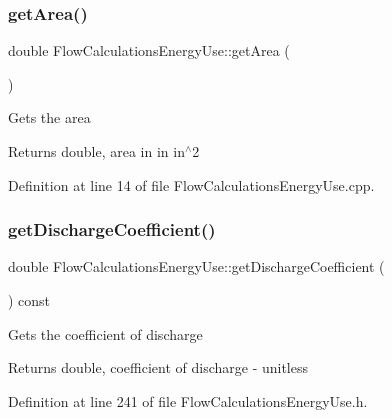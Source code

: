 \subsubsection{\texorpdfstring{get\+Area()}{getArea()}\hspace{0.1cm}{\footnotesize\ttfamily [3/3]}}
{\footnotesize\ttfamily double Flow\+Calculations\+Energy\+Use\+::get\+Area (\begin{DoxyParamCaption}{ }\end{DoxyParamCaption})}

Gets the area

\begin{DoxyReturn}{Returns}
double, area in in in$^\wedge$2 
\end{DoxyReturn}


Definition at line 14 of file Flow\+Calculations\+Energy\+Use.\+cpp.

\mbox{\label{class_flow_calculations_energy_use_a28033765df3a220b5c7d75e34fd95c43}} 
\subsubsection{\texorpdfstring{get\+Discharge\+Coefficient()}{getDischargeCoefficient()}\hspace{0.1cm}{\footnotesize\ttfamily [1/3]}}
{\footnotesize\ttfamily double Flow\+Calculations\+Energy\+Use\+::get\+Discharge\+Coefficient (\begin{DoxyParamCaption}{ }\end{DoxyParamCaption}) const\hspace{0.3cm}{\ttfamily [inline]}}

Gets the coefficient of discharge

\begin{DoxyReturn}{Returns}
double, coefficient of discharge -\/ unitless 
\end{DoxyReturn}


Definition at line 241 of file Flow\+Calculations\+Energy\+Use.\+h.

\mbox{\label{class_flow_calculations_energy_use_a28033765df3a220b5c7d75e34fd95c43}} 
